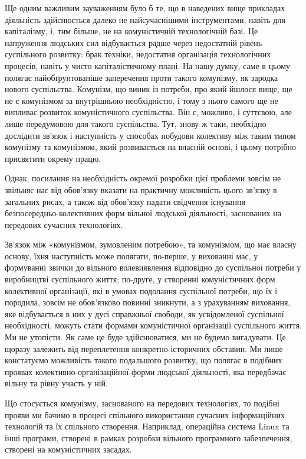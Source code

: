 \documentclass[../main]{subfiles}
\begin{document}
Ще одним важливим зауваженням було б те, що в наведених вище прикладах діяльність здійснюється далеко не найсучаснішими інструментами, навіть для капіталізму, і, тим більше, не на комуністичній технологічній базі. Це напруження людських сил відбувається радше через недостатній рівень суспільного розвитку: брак техніки, недостатня організація технологічних процесів, навіть у чисто капіталістичному плані. На нашу думку, саме в цьому полягає найобґрунтованіше заперечення проти такого комунізму, як зародка нового суспільства. Комунізм, що виник із потреби, про який йшлося вище, ще не є комунізмом за внутрішньою необхідністю, і тому з нього самого ще не випливає розвиток комуністичного суспільства. Він є, можливо, і суттєвою, але лише передумовою для такого суспільства. Тут, знову ж таки, необхідно дослідити зв’язок і наступність у способах побудови колективу між таким типом комунізму та комунізмом, який розвивається на власній основі, і цьому потрібно присвятити окрему працю.

Однак, посилання на необхідність окремої розробки цієї проблеми зовсім не звільняє нас від обов’язку вказати на практичну можливість цього зв’язку в загальних рисах, а також від обов’язку надати свідчення існування безпосередньо-колективних форм вільної людської діяльності, заснованих на передових сучасних технологіях.

Зв’язок між «комунізмом, зумовленим потребою», та комунізмом, що має власну основу, їхня наступність може полягати, по-перше, у вихованні мас, у формуванні звички до вільного волевиявлення відповідно до суспільної потреби у виробництві суспільного життя; по-друге, у створенні комуністичних форм колективної організації, які в умовах подолання суспільної потреби, що їх і породила, зовсім не обов’язково повинні зникнути, а з урахуванням виховання, яке відбувається в них у дусі справжньої свободи, як усвідомленої суспільної необхідності, можуть стати формами комуністичної організації суспільного життя. Ми не утопісти. Як саме це буде здійснюватися, ми не будемо вигадувати. Це щоразу залежить від переплетення конкретно-історичних обставин. Ми лише констатуємо можливість такого подальшого розвитку, що полягає в подібних проявах колективно-організаційної форми людської діяльності, яка передбачає вільну та рівну участь у ній.

Що стосується комунізму, заснованого на передових технологіях, то подібні прояви ми бачимо в процесі спільного використання сучасних інформаційних технологій та їх спільного створення. Наприклад, операційна система Linux та інші програми, створені в рамках розробки вільного програмного забезпечення, створені на комуністичних засадах.
\end{document}

